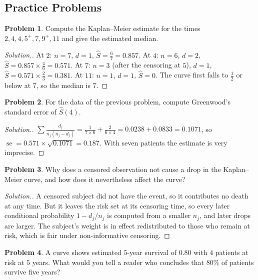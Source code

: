 \documentclass[11pt,a4paper]{article}
\numberwithin{equation}{section}
\theoremstyle{definition}
\newtheorem{problemx}{Problem}[subsection]
\newenvironment{problem}{\begin{problemx}}{\end{problemx}}
\newenvironment{solution}
  {\renewcommand{\qedsymbol}{}\begin{proof}[\textit{Solution}.]}
  {\end{proof}}
\begin{document}
\subsection{Practice Problems}

\begin{problem}
Compute the Kaplan--Meier estimate for the times $2, 4, 4, 5^+, 7, 9^+, 11$ and give the estimated median.
\end{problem}

\begin{solution}
At $2$: $n = 7$, $d = 1$, $\hat S = \frac67 = 0.857$. At $4$: $n = 6$, $d = 2$, $\hat S = 0.857 \times \frac46 = 0.571$. At $7$: $n = 3$ (after the censoring at $5$), $d = 1$, $\hat S = 0.571 \times \frac23 = 0.381$. At $11$: $n = 1$, $d = 1$, $\hat S = 0$. The curve first falls to $\frac12$ or below at $7$, so the median is $7$.
\end{solution}

\begin{problem}
For the data of the previous problem, compute Greenwood's standard error of $\hat S(4)$.
\end{problem}

\begin{solution}
$\sum\frac{d_j}{n_j(n_j - d_j)} = \frac1{7 \times 6} + \frac2{6 \times 4} = 0.0238 + 0.0833 = 0.1071$, so $\operatorname{se} = 0.571 \times \sqrt{0.1071} = 0.187$. With seven patients the estimate is very imprecise.
\end{solution}

\begin{problem}
Why does a censored observation not cause a drop in the Kaplan--Meier curve, and how does it nevertheless affect the curve?
\end{problem}

\begin{solution}
A censored subject did not have the event, so it contributes no death at any time. But it leaves the risk set at its censoring time, so every later conditional probability $1 - d_j/n_j$ is computed from a smaller $n_j$, and later drops are larger. The subject's weight is in effect redistributed to those who remain at risk, which is fair under non-informative censoring.
\end{solution}

\begin{problem}
A curve shows estimated $5$-year survival of $0.80$ with $4$ patients at risk at $5$ years. What would you tell a reader who concludes that $80\%$ of patients survive five years?
\end{problem}
\end{document}

